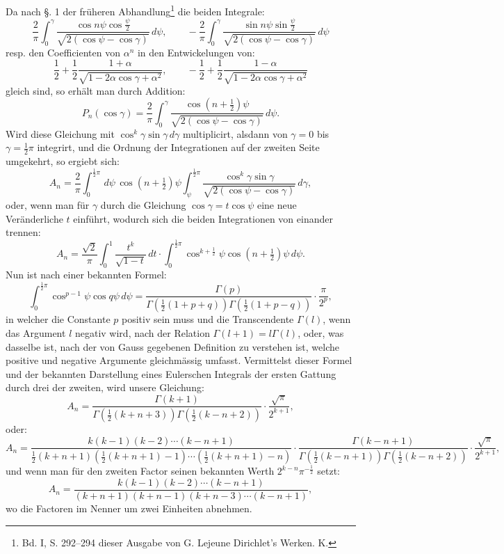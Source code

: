 \documentclass[11pt]{article}
\newcommand{\dd}{\,d}
\begin{document}
Da nach §. 1 der früheren Abhandlung\footnote{Bd. I, S. 292--294 dieser Ausgabe von G. Lejeune Dirichlet's Werken. K.} die beiden Integrale:
\[
 \frac{2}{\pi}\int_0^\gamma \frac{\cos n\psi\cos\frac{\psi}{2}}{\sqrt{2(\cos\psi-\cos\gamma)}}\dd\psi,
\qquad
 -\frac{2}{\pi}\int_0^\gamma \frac{\sin n\psi\sin\frac{\psi}{2}}{\sqrt{2(\cos\psi-\cos\gamma)}}\dd\psi
\]
resp. den Coefficienten von $\alpha^n$ in den Entwickelungen von:
\[
 \frac12+\frac12\frac{1+\alpha}{\sqrt{1-2\alpha\cos\gamma+\alpha^2}},
\qquad
 -\frac12+\frac12\frac{1-\alpha}{\sqrt{1-2\alpha\cos\gamma+\alpha^2}}
\]
gleich sind, so erhält man durch Addition:
\[
 P_n(\cos\gamma)=\frac2\pi\int_0^\gamma\frac{\cos(n+\frac12)\psi}{\sqrt{2(\cos\psi-\cos\gamma)}}\dd\psi.
\]
Wird diese Gleichung mit $\cos^k\gamma\sin\gamma\dd\gamma$ multiplicirt, alsdann von $\gamma=0$ bis $\gamma=\frac12\pi$ integrirt, und die Ordnung der Integrationen auf der zweiten Seite umgekehrt, so ergiebt sich:
\[
 A_n=\frac2\pi\int_0^{\frac12\pi}\dd\psi\,\cos(n+\tfrac12)\psi
 \int_\psi^{\frac12\pi}\frac{\cos^k\gamma\sin\gamma}{\sqrt{2(\cos\psi-\cos\gamma)}}\dd\gamma,
\]
oder, wenn man für $\gamma$ durch die Gleichung $\cos\gamma=t\cos\psi$ eine neue Veränderliche $t$ einführt, wodurch sich die beiden Integrationen von einander trennen:
\[
 A_n=\frac{\sqrt2}{\pi}\int_0^1\frac{t^k}{\sqrt{1-t}}\dd t\cdot
 \int_0^{\frac12\pi}\cos^{k+\frac12}\psi\cos(n+\tfrac12)\psi\dd\psi.
\]
Nun ist nach einer bekannten Formel:
\[
 \int_0^{\frac12\pi}\cos^{p-1}\psi\cos q\psi\dd\psi
 =\frac{\Gamma(p)}{\Gamma\left(\frac12(1+p+q)\right)\Gamma\left(\frac12(1+p-q)\right)}\cdot\frac{\pi}{2^p},
\]
in welcher die Constante $p$ positiv sein muss und die Transcendente $\Gamma(l)$, wenn das Argument $l$ negativ wird, nach der Relation $\Gamma(l+1)=l\Gamma(l)$, oder, was dasselbe ist, nach der von Gauss gegebenen Definition zu verstehen ist, welche positive und negative Argumente gleichmässig umfasst. Vermittelst dieser Formel und der bekannten Darstellung eines Eulerschen Integrals der ersten Gattung durch drei der zweiten, wird unsere Gleichung:
\[
 A_n=\frac{\Gamma(k+1)}{\Gamma\left(\frac12(k+n+3)\right)\Gamma\left(\frac12(k-n+2)\right)}\cdot\frac{\sqrt\pi}{2^{k+1}},
\]
oder:
\[
 A_n=\frac{k(k-1)(k-2)\cdots(k-n+1)}{\frac12(k+n+1)\left(\frac12(k+n+1)-1\right)\cdots\left(\frac12(k+n+1)-n\right)}
 \cdot\frac{\Gamma(k-n+1)}{\Gamma\left(\frac12(k-n+1)\right)\Gamma\left(\frac12(k-n+2)\right)}\cdot\frac{\sqrt\pi}{2^{k+1}},
\]
und wenn man für den zweiten Factor seinen bekannten Werth $2^{k-n}\pi^{-\frac12}$ setzt:
\[
 A_n=\frac{k(k-1)(k-2)\cdots(k-n+1)}{(k+n+1)(k+n-1)(k+n-3)\cdots(k-n+1)},
\]
wo die Factoren im Nenner um zwei Einheiten abnehmen.
\end{document}
